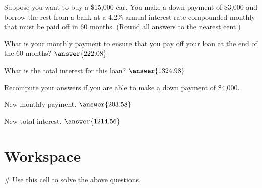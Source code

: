 \documentclass{ximera}
\begin{document}
\begin{question}
Suppose you want to buy a \$15,000 car. You make a down payment of \$3,000 and borrow the rest from a bank at a 4.2\% annual interest rate compounded monthly that must be paid off in 60 months. (Round all answers to the nearest cent.)
	
What is your monthly payment to ensure that you pay off your loan at the end of the 60 months? $\answer{222.08}$

What is the total interest for this loan? $\answer{1324.98}$

Recompute your answers if you are able to make a down payment of \$4,000.

New monthly payment. $\answer{203.58}$

New total interest. $\answer{1214.56}$
\end{question}

\begin{question}

\end{question}

\section{Workspace}

\begin{sageCell}
# Use this cell to solve the above questions.
\end{sageCell}
\end{document}
